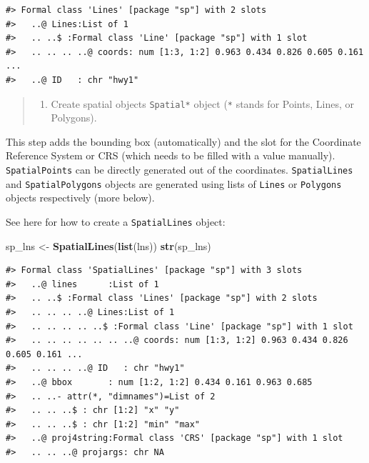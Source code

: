 \documentclass[]{book}
\newenvironment{Shaded}{\begin{snugshade}}{\end{snugshade}}
\newcommand{\KeywordTok}[1]{\textcolor[rgb]{0.13,0.29,0.53}{\textbf{#1}}}
\newcommand{\StringTok}[1]{\textcolor[rgb]{0.31,0.60,0.02}{#1}}
\newcommand{\NormalTok}[1]{#1}
\providecommand{\tightlist}{%
  \setlength{\itemsep}{0pt}\setlength{\parskip}{0pt}}
\theoremstyle{definition}
\theoremstyle{definition}
\theoremstyle{definition}
\theoremstyle{remark}
\begin{document}
\begin{verbatim}
#> Formal class 'Lines' [package "sp"] with 2 slots
#>   ..@ Lines:List of 1
#>   .. ..$ :Formal class 'Line' [package "sp"] with 1 slot
#>   .. .. .. ..@ coords: num [1:3, 1:2] 0.963 0.434 0.826 0.605 0.161 ...
#>   ..@ ID   : chr "hwy1"
\end{verbatim}

\begin{quote}
\begin{enumerate}
\def\labelenumi{\Roman{enumi}.}
\setcounter{enumi}{1}
\tightlist
\item
  Create spatial objects \texttt{Spatial*} object (\texttt{*} stands for
  Points, Lines, or Polygons).
\end{enumerate}
\end{quote}

This step adds the bounding box (automatically) and the slot for the
Coordinate Reference System or CRS (which needs to be filled with a
value manually). \texttt{SpatialPoints} can be directly generated out of
the coordinates. \texttt{SpatialLines} and \texttt{SpatialPolygons}
objects are generated using lists of \texttt{Lines} or \texttt{Polygons}
objects respectively (more below).

See here for how to create a \texttt{SpatialLines} object:

\begin{Shaded}
\begin{Highlighting}[]
\NormalTok{sp_lns <-}\StringTok{ }\KeywordTok{SpatialLines}\NormalTok{(}\KeywordTok{list}\NormalTok{(lns))}
\KeywordTok{str}\NormalTok{(sp_lns)}
\end{Highlighting}
\end{Shaded}

\begin{verbatim}
#> Formal class 'SpatialLines' [package "sp"] with 3 slots
#>   ..@ lines      :List of 1
#>   .. ..$ :Formal class 'Lines' [package "sp"] with 2 slots
#>   .. .. .. ..@ Lines:List of 1
#>   .. .. .. .. ..$ :Formal class 'Line' [package "sp"] with 1 slot
#>   .. .. .. .. .. .. ..@ coords: num [1:3, 1:2] 0.963 0.434 0.826 0.605 0.161 ...
#>   .. .. .. ..@ ID   : chr "hwy1"
#>   ..@ bbox       : num [1:2, 1:2] 0.434 0.161 0.963 0.685
#>   .. ..- attr(*, "dimnames")=List of 2
#>   .. .. ..$ : chr [1:2] "x" "y"
#>   .. .. ..$ : chr [1:2] "min" "max"
#>   ..@ proj4string:Formal class 'CRS' [package "sp"] with 1 slot
#>   .. .. ..@ projargs: chr NA
\end{verbatim}
\end{document}
